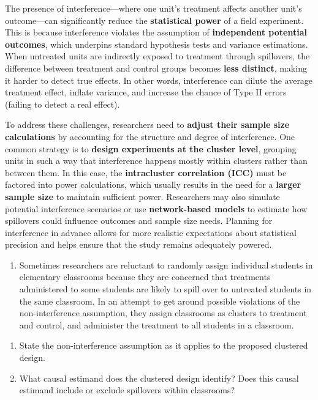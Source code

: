 \documentclass[
  letterpaper,
  DIV=11,
  numbers=noendperiod]{scrartcl}
\providecommand{\tightlist}{%
  \setlength{\itemsep}{0pt}\setlength{\parskip}{0pt}}\usepackage{longtable,booktabs,array}
\begin{document}
The presence of interference---where one unit's treatment affects
another unit's outcome---can significantly reduce the
\textbf{statistical power} of a field experiment. This is because
interference violates the assumption of \textbf{independent potential
outcomes}, which underpins standard hypothesis tests and variance
estimations. When untreated units are indirectly exposed to treatment
through spillovers, the difference between treatment and control groups
becomes \textbf{less distinct}, making it harder to detect true effects.
In other words, interference can dilute the average treatment effect,
inflate variance, and increase the chance of Type II errors (failing to
detect a real effect).

To address these challenges, researchers need to \textbf{adjust their
sample size calculations} by accounting for the structure and degree of
interference. One common strategy is to \textbf{design experiments at
the cluster level}, grouping units in such a way that interference
happens mostly within clusters rather than between them. In this case,
the \textbf{intracluster correlation (ICC)} must be factored into power
calculations, which usually results in the need for a \textbf{larger
sample size} to maintain sufficient power. Researchers may also simulate
potential interference scenarios or use \textbf{network-based models} to
estimate how spillovers could influence outcomes and sample size needs.
Planning for interference in advance allows for more realistic
expectations about statistical precision and helps ensure that the study
remains adequately powered.

\begin{enumerate}
\def\labelenumi{\arabic{enumi}.}
\setcounter{enumi}{8}
\tightlist
\item
  Sometimes researchers are reluctant to randomly assign individual
  students in elementary classrooms because they are concerned that
  treatments administered to some students are likely to spill over to
  untreated students in the same classroom. In an attempt to get around
  possible violations of the non-interference assumption, they assign
  classrooms as clusters to treatment and control, and administer the
  treatment to all students in a classroom.
\end{enumerate}

\begin{enumerate}
\def\labelenumi{(\alph{enumi})}
\item
  State the non-interference assumption as it applies to the proposed
  clustered design.
\item
  What causal estimand does the clustered design identify? Does this
  causal estimand include or exclude spillovers within classrooms?
\end{enumerate}
\end{document}
